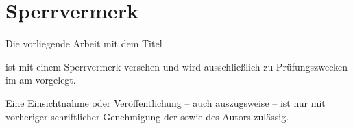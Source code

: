 \newpage
{}
\section*{Sperrvermerk}

Die vorliegende Arbeit mit dem Titel 

\begin{center}
    \normalsize\textit{\projecttitle} 
\end{center}

ist mit einem Sperrvermerk versehen und wird ausschließlich zu Prüfungszwecken im \degreeprogram{} \faculty{} \university{} am \universitycity{} vorgelegt.

\vspace{0.5cm}

Eine Einsichtnahme oder Veröffentlichung – auch auszugsweise – ist nur mit vorheriger schriftlicher Genehmigung der \companyname{} sowie des Autors zulässig.
